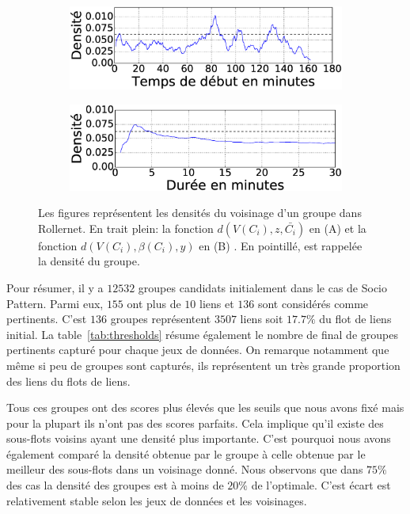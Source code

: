 \begin{figure}
\centering
\begin{subfigure}{0.45\linewidth}
	\includegraphics[width=\linewidth]{img/GroupeDense/GroupExample/Rollernet/vairable_start7}
	\caption{}
	\label{fig:g7_debut}
\end{subfigure}
\begin{subfigure}{0.45\linewidth}
	\includegraphics[width=\linewidth]{img/GroupeDense/GroupExample/Rollernet/vairable_duration7}
	\caption{}
	\label{fig:g7_duree}
\end{subfigure}
\caption{
Les figures représentent les densités du voisinage d'un groupe dans Rollernet.
En trait plein: la fonction $d(V(C_i),z,\bar{C_i})$ en (A) et la fonction  $d(V(C_i),\beta(C_i),y)$ en (B) .
En pointillé, est rappelée la densité du groupe.
}
\label{fig:Rollernet_exemple}
\end{figure}





\bigskip
Pour résumer, il y a $12 532$  groupes candidats initialement dans le cas de Socio Pattern.
Parmi eux, $155$ ont plus de $10$ liens et $136$ sont considérés comme pertinents.
C'est $136$ groupes représentent $3507$ liens soit $17.7\%$ du flot de liens initial.
La table~\ref{tab:thresholds} résume également le nombre de final de groupes pertinents capturé pour chaque jeux de données.
On remarque notamment que même si peu de groupes sont capturés, ils représentent un très grande proportion des liens du flots de liens.

Tous ces groupes ont des scores plus élevés que les seuils que nous avons fixé mais pour la plupart ils n'ont pas des scores parfaits.
Cela implique qu'il existe des sous-flots voisins ayant une densité plus importante.
C'est pourquoi nous avons également comparé la densité obtenue par le groupe à celle obtenue par le meilleur des sous-flots dans un voisinage donné.
Nous observons que dans $75\%$ des cas la densité des groupes est à moins de $20\%$ de l'optimale.
C'est écart est relativement stable selon les jeux de données et les voisinages.

